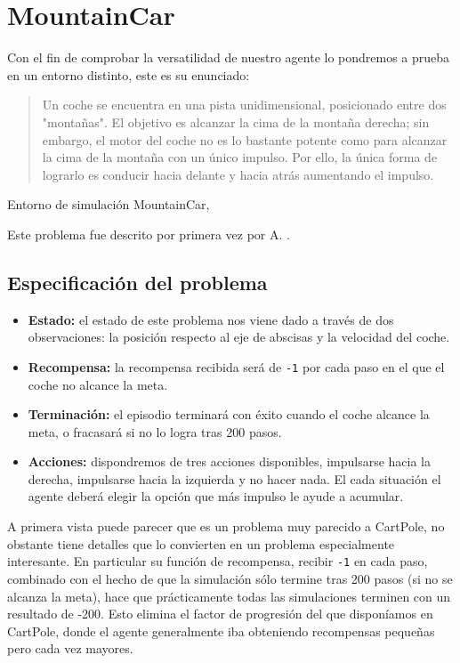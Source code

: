 \section{MountainCar}

Con el fin de comprobar la versatilidad de nuestro agente lo pondremos a prueba en un entorno distinto, este es su enunciado:

\begin{quote}
    Un coche se encuentra en una pista unidimensional, posicionado entre dos "montañas". El objetivo es alcanzar la cima de la montaña derecha; sin embargo, el motor del coche no es lo bastante potente como para alcanzar la cima de la montaña con un único impulso. Por ello, la única forma de lograrlo es conducir hacia delante y hacia atrás aumentando el impulso.
\end{quote}

%
       {Entorno de simulación MountainCar, \citet{brockman2016openai}}

Este problema fue descrito por primera vez por A. \citet{Moore90efficientmemory-based}.

\subsection{Especificación del problema}

\begin{itemize}
    \item \textbf{Estado:} el estado de este problema nos viene dado a través de dos observaciones: la posición respecto al eje de abscisas y la velocidad del coche.
    \item \textbf{Recompensa:} la recompensa recibida será de \texttt{-1} por cada paso en el que el coche no alcance la meta.
    \item \textbf{Terminación:} el episodio terminará con éxito cuando el coche alcance la meta, o fracasará si no lo logra tras 200 pasos.
    \item \textbf{Acciones:} dispondremos de tres acciones disponibles, impulsarse hacia la derecha, impulsarse hacia la izquierda y no hacer nada. El cada situación el agente deberá elegir la opción que más impulso le ayude a acumular.
\end{itemize}

A primera vista puede parecer que es un problema muy parecido a CartPole, no obstante tiene detalles que lo convierten en un problema especialmente interesante. En particular su función de recompensa, recibir \texttt{-1} en cada paso, combinado con el hecho de que la simulación sólo termine tras 200 pasos (si no se alcanza la meta), hace que prácticamente todas las simulaciones terminen con un resultado de -200. Esto elimina el factor de progresión del que disponíamos en CartPole, donde el agente generalmente iba obteniendo recompensas pequeñas pero cada vez mayores.


